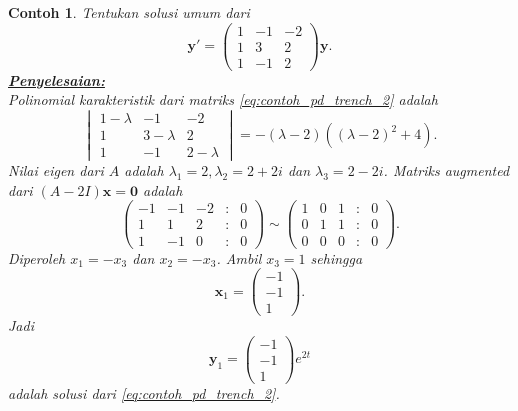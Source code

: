 \documentclass[a4paper]{article}
\theoremstyle{definisi}
\newtheorem{contoh}{Contoh}[subsection]
\newcommand{\solusi}{\textbf{\underline{Penyelesaian:}}\\}
\numberwithin{equation}{section}
\begin{document}
  \begin{contoh}
    Tentukan solusi umum dari 
    \begin{equation}\label{eq:contoh_pd_trench_2}
      \mathbf{y'} = \begin{pmatrix}
        1 & -1 & -2\\
        1 & 3 & 2\\
        1 & -1 & 2
      \end{pmatrix}\mathbf{y}.
    \end{equation}
    \solusi
    Polinomial karakteristik dari matriks \eqref{eq:contoh_pd_trench_2} adalah
    \begin{equation}
      \begin{vmatrix}
        1-\lambda & -1 & -2\\
        1 & 3-\lambda & 2\\
        1 & -1 & 2-\lambda
      \end{vmatrix} = -(\lambda-2)((\lambda-2)^2+4).
    \end{equation}
    Nilai eigen dari $A$ adalah $\lambda_1 = 2, \lambda_2 = 2+2i$ dan $\lambda_3 = 2-2i$. Matriks \textit{augmented} dari $(A-2I)\mathbf{x} = \mathbf{0}$ adalah
    \begin{equation*}
      \begin{pmatrix}
        -1 & -1 & -2 &:& 0\\
        1 & 1 & 2 &:& 0\\
        1 & -1 & 0 &:& 0
      \end{pmatrix} \sim \begin{pmatrix}
        1 & 0 & 1 &:& 0\\
        0 & 1 & 1 &:& 0\\
        0 & 0 & 0 &:& 0
      \end{pmatrix}.
    \end{equation*}
    Diperoleh $x_1 = -x_3$ dan $x_2 = -x_3$. Ambil $x_3 = 1$ sehingga
    \[\mathbf{x}_1 = \begin{pmatrix}-1\\-1\\1\end{pmatrix}.\]
    Jadi
    \[\mathbf{y}_1 = \begin{pmatrix}-1\\-1\\1\end{pmatrix}e^{2t}\]
    adalah solusi dari \eqref{eq:contoh_pd_trench_2}. 
    

\end{contoh}
\end{document}
